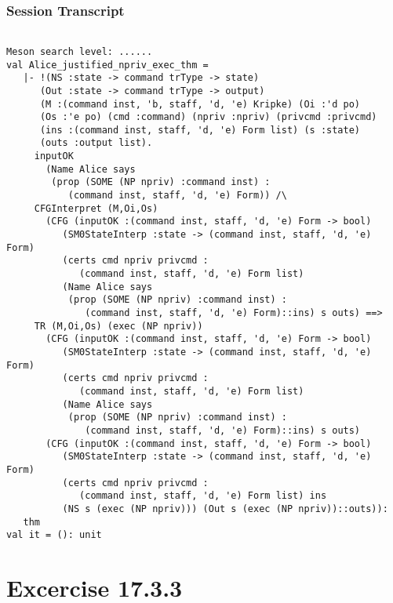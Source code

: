 \documentclass{report}
\begin{document}
\subsection{Session Transcript}
\label{trans3}
\begin{session}
  \begin{scriptsize}
\begin{verbatim}

Meson search level: ......
val Alice_justified_npriv_exec_thm =
   |- !(NS :state -> command trType -> state)
      (Out :state -> command trType -> output)
      (M :(command inst, 'b, staff, 'd, 'e) Kripke) (Oi :'d po)
      (Os :'e po) (cmd :command) (npriv :npriv) (privcmd :privcmd)
      (ins :(command inst, staff, 'd, 'e) Form list) (s :state)
      (outs :output list).
     inputOK
       (Name Alice says
        (prop (SOME (NP npriv) :command inst) :
           (command inst, staff, 'd, 'e) Form)) /\
     CFGInterpret (M,Oi,Os)
       (CFG (inputOK :(command inst, staff, 'd, 'e) Form -> bool)
          (SM0StateInterp :state -> (command inst, staff, 'd, 'e) Form)
          (certs cmd npriv privcmd :
             (command inst, staff, 'd, 'e) Form list)
          (Name Alice says
           (prop (SOME (NP npriv) :command inst) :
              (command inst, staff, 'd, 'e) Form)::ins) s outs) ==>
     TR (M,Oi,Os) (exec (NP npriv))
       (CFG (inputOK :(command inst, staff, 'd, 'e) Form -> bool)
          (SM0StateInterp :state -> (command inst, staff, 'd, 'e) Form)
          (certs cmd npriv privcmd :
             (command inst, staff, 'd, 'e) Form list)
          (Name Alice says
           (prop (SOME (NP npriv) :command inst) :
              (command inst, staff, 'd, 'e) Form)::ins) s outs)
       (CFG (inputOK :(command inst, staff, 'd, 'e) Form -> bool)
          (SM0StateInterp :state -> (command inst, staff, 'd, 'e) Form)
          (certs cmd npriv privcmd :
             (command inst, staff, 'd, 'e) Form list) ins
          (NS s (exec (NP npriv))) (Out s (exec (NP npriv))::outs)):
   thm
val it = (): unit

\end{verbatim}
  \end{scriptsize}
\end{session}







\chapter{Excercise 17.3.3}
\label{cha:17.3.3}
\end{document}
